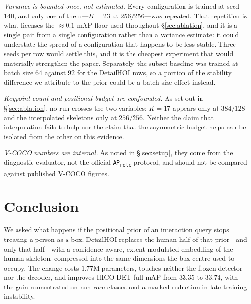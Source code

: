 \documentclass[12pt,a4paper]{article}
\begin{document}
\emph{Variance is bounded once, not estimated.} Every configuration is trained
at seed $140$, and only one of them---$K{=}23$ at $256/256$---was repeated. That
repetition is what licenses the $\approx\!0.1$ mAP floor used throughout
\S\ref{sec:ablation}, and it is a single pair from a single configuration rather
than a variance estimate: it could understate the spread of a configuration that
happens to be less stable. Three seeds per row would settle this, and it is the
cheapest experiment that would materially strengthen the paper. Separately, the
subset baseline was trained at batch size $64$ against $92$ for the DetailHOI
rows, so a portion of the stability difference we attribute to the prior could
be a batch-size effect instead.

\emph{Keypoint count and positional budget are confounded.} As set out in
\S\ref{sec:ablation}, no run crosses the two variables: $K{=}17$ appears only at
$384/128$ and the interpolated skeletons only at $256/256$. Neither the claim
that interpolation fails to help nor the claim that the asymmetric budget helps
can be isolated from the other on this evidence.

\emph{V-COCO numbers are internal.} As noted in \S\ref{sec:setup}, they come
from the diagnostic evaluator, not the official \texttt{AP\textsubscript{role}}
protocol, and should not be compared against published V-COCO figures.

\section{Conclusion}

We asked what happens if the positional prior of an interaction query stops
treating a person as a box. DetailHOI replaces the human half of that
prior---and only that half---with a confidence-aware, extent-modulated embedding
of the human skeleton, compressed into the same dimensions the box centre used
to occupy. The change costs $1.77$M parameters, touches neither the frozen
detector nor the decoder, and improves HICO-DET full mAP from $33.35$ to
$33.74$, with the gain concentrated on non-rare classes and a marked reduction
in late-training instability.
\end{document}
